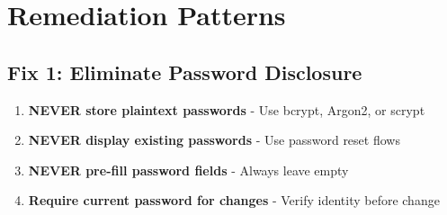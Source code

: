 \documentclass[11pt,letterpaper]{article}
\begin{document}
\par

\section{Remediation Patterns}

\subsection{Fix 1: Eliminate Password Disclosure}

\begin{criticalbox}
\begin{enumerate}
  \item \textbf{NEVER store plaintext passwords} - Use bcrypt, Argon2, or scrypt
  \item \textbf{NEVER display existing passwords} - Use password reset flows
  \item \textbf{NEVER pre-fill password fields} - Always leave empty
  \item \textbf{Require current password for changes} - Verify identity before change
\end{enumerate}
\end{criticalbox}
\end{document}
